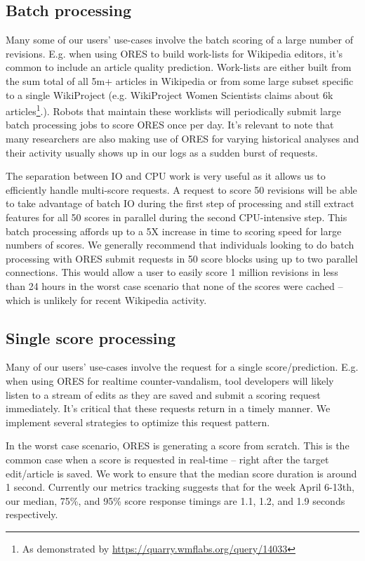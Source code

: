 \subsection{Batch processing}
Many some of our users' use-cases involve the batch scoring of a large number of revisions.  E.g. when using ORES to build work-lists for Wikipedia editors, it's common to include an article quality prediction.  Work-lists are either built from the sum total of all 5m+ articles in Wikipedia or from some large subset specific to a single WikiProject (e.g. WikiProject Women Scientists claims about 6k articles\footnote{As demonstrated by \url{https://quarry.wmflabs.org/query/14033}}.).  Robots that maintain these worklists will periodically submit large batch processing jobs to score ORES once per day.  It's relevant to note that many researchers are also making use of ORES for varying historical analyses and their activity usually shows up in our logs as a sudden burst of requests.

The separation between IO and CPU work is very useful as it allows us to efficiently handle multi-score requests.  A request to score 50 revisions will be able to take advantage of batch IO during the first step of processing and still extract features for all 50 scores in parallel during the second CPU-intensive step.  This batch processing affords up to a 5X increase in time to scoring speed for large numbers of scores\cite{sarabadani2017building}.  We generally recommend that individuals looking to do batch processing with ORES submit requests in 50 score blocks using up to two parallel connections.  This would allow a user to easily score 1 million revisions in less than 24 hours in the worst case scenario that none of the scores were cached -- which is unlikely for recent Wikipedia activity.

\subsection{Single score processing}
Many of our users' use-cases involve the request for a single score/prediction.  E.g. when using ORES for realtime counter-vandalism, tool developers will likely listen to a stream of edits as they are saved and submit a scoring request immediately.  It's critical that these requests return in a timely manner.  We implement several strategies to optimize this request pattern.

In the worst case scenario, ORES is generating a score from scratch.  This is the common case when a score is requested in real-time -- right after the target edit/article is saved.  We work to ensure that the median score duration is around 1 second.  Currently our metrics tracking suggests that for the week April 6-13th, our median, 75\%, and 95\% score response timings are 1.1, 1.2, and 1.9 seconds respectively.

